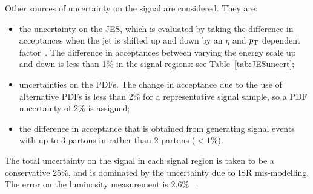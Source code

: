 Other sources of uncertainty on the signal are considered. They are:
\begin{itemize}
  \item the uncertainty on the \ac{JES}, which is evaluated by taking the difference in acceptances when the jet \ptv is shifted up and down by an $\eta$ and $p_{\text{T}}$ dependent factor~\cite{tw:JECuncert}. The difference in acceptances between varying the energy scale up and down is less than 1\% in the signal regions: see Table~\ref{tab:JESuncert};
  \item uncertainties on the \ac{PDFs}. The change in acceptance due to the use of alternative \ac{PDFs} is less than 2\% for a representative signal sample, so a PDF uncertainty of 2\% is assigned; 
  \item the difference in acceptance that is obtained from generating signal events with up to 3 partons in \MADGRAPH rather than 2 partons ($<1\%$). 
\end{itemize}

The total uncertainty on the signal in each signal region is taken to be a conservative 25$\%$, and is dominated by the uncertainty due to \ac{ISR} mis-modelling.
The error on the luminosity measurement is 2.6\% ~\cite{lumi:Summer2013}.


